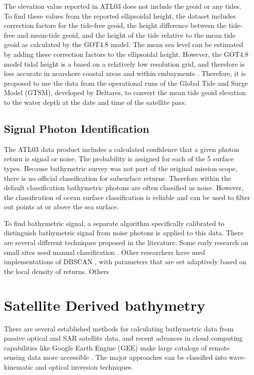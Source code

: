 The elevation value reported in ATL03 does not include the geoid or any tides. To find these values from the reported ellipsoidal height, the dataset includes correction factors for the tide-free geoid, the height difference between the tide-free and mean-tide geoid, and the height of the tide relative to the mean tide geoid as calculated by the GOT4.8 model. The mean sea level can be estimated by adding these correction factors to the ellipsoidal height. However, the GOT4.8 model tidal height is a based on a relatively low resolution grid, and therefore is less accurate in nearshore coastal areas and within embayments \parencite{Neumann2019e}. Therefore, it is proposed to use the data from the operational runs of the Global Tide and Surge Model (GTSM), developed by Deltares, to convert the mean tide geoid elevation to the water depth at the date and time of the satellite pass.

\subsection{Signal Photon Identification}

The ATL03 data product includes a calculated confidence that a given photon return is signal or noise. The probability is assigned for each of the 5 surface types. Because bathymetric survey was not part of the original mission scope, there is no official classification for subsurface returns. Therefore within the default classification bathymetric photons are often classified as noise. However, the classification of ocean surface classification is reliable and can be used to filter out points at or above the sea surface.

To find bathymetric signal, a separate algorithm specifically calibrated to distinguish bathymetric signal from noise photons is applied to this data. There are several different techniques proposed in the literature. Some early research on small sites used manual classification \parencite{Forfinski-Sarkozi2016}. Other researchers have used implementations of DBSCAN \parencite{Ester1996}, with parameters that are set adaptively based on the local density of returns. Others


\section{Satellite Derived bathymetry}
There are several established methods for calculating bathymetric data from passive optical and SAR satellite data, and recent advances in cloud computing capabilities like Google Earth Engine (GEE) \parencite{Gorelick2017a} make large catalogs of remote sensing data more accessible \parencite{Pike2019,Turner2021}. The major approaches can be classified into wave-kinematic and optical inversion techniques.


